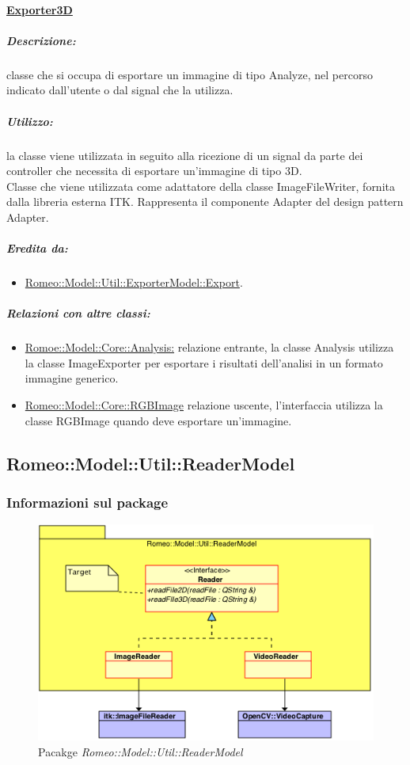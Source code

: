 		\paragraph{\underline{Exporter3D}}
			\label{expo_img} 
				\subparagraph{Descrizione:} classe che si occupa di esportare un immagine di tipo Analyze\g{}, nel percorso indicato dall'utente o dal signal\glossario{} che la utilizza. 
				\subparagraph{Utilizzo:} la classe viene utilizzata in seguito alla ricezione di un signal\glossario{} da parte dei controller che necessita di esportare un'immagine di tipo 3D.
				 	\\Classe che viene utilizzata come adattatore della classe ImageFileWriter, fornita dalla libreria esterna ITK\g{}. Rappresenta il componente Adapter del design pattern\g{} Adapter.
				\subparagraph{Eredita da:}
					\begin{itemize}
						\item \hyperref[expo]{Romeo::Model::Util::ExporterModel::Export}.				
					\end{itemize}	
				\subparagraph{Relazioni con altre classi:}
					\begin{itemize}
						\item \hyperref[]{Romoe::Model::Core::Analysis:} relazione entrante, la classe Analysis utilizza la classe ImageExporter per esportare i risultati dell'analisi in un formato immagine generico.
							\item \hyperref[]{Romeo::Model::Core::RGBImage} relazione uscente, l'interfaccia utilizza la classe RGBImage quando deve esportare un'immagine.
						\end{itemize}	


	\pagebreak
		\subsection{Romeo::Model::Util::ReaderModel}
	\label{romeo::model::util::readermodel}
		\subsubsection{Informazioni sul package}
		\label{info_readmod}
		\begin{figure}[!h]
			\centering
			\includegraphics[width=0.9\linewidth]{./Content/Immagini/Romeo__Model__Util__ReaderModel.png}
			\caption{Pacakge \textsl{Romeo::Model::Util::ReaderModel}}
			\label{comp_read}
		\end{figure}
